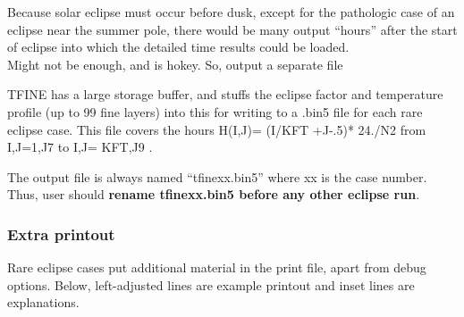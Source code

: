 \documentclass{article}
\begin{document}
Because solar eclipse must occur before dusk, except for the pathologic case of
an eclipse near the summer pole, there would be many output ``hours'' after
the start of eclipse into which the detailed time results could be loaded.
\\ Might not be enough, and is hokey. So, output a separate file

TFINE has a large storage buffer, and stuffs the eclipse factor and temperature
profile (up to 99 fine layers) into this for writing to a .bin5 file for each
rare eclipse case.  This file covers the hours H(I,J)= (I/KFT +J-.5)* 24./N2  from I,J=1,J7  to I,J= KFT,J9 . 

The output file is always named ``tfinexx.bin5'' where xx is the
case number. Thus, user should \textbf{rename tfinexx.bin5 before any other  eclipse run}. 

\subsubsection{Extra printout}

Rare eclipse cases put additional material in the print file, apart from debug
options. Below, left-adjusted lines are example printout and inset lines are
explanations.
\end{document}
